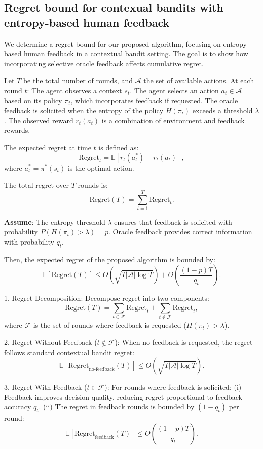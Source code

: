 \subsection{Regret bound for contexual bandits with entropy-based human feedback}

We determine a regret bound for our proposed algorithm, focusing on entropy-based human feedback in a contextual bandit setting. The goal is to show how incorporating selective oracle feedback affects cumulative regret.


Let \(T\) be the total number of rounds, and \(\mathcal{A}\) the set of available actions. At each round \(t\): The agent observes a context \(s_t\). The agent selects an action \(a_t \in \mathcal{A}\) based on its policy \(\pi_t\), which incorporates feedback if requested. The oracle feedback is solicited when the entropy of the policy \(H(\pi_t)\) exceeds a threshold \(\lambda\). The observed reward \(r_t(a_t)\) is a combination of environment and feedback rewards.

The expected regret at time \(t\) is defined as:
\[
\text{Regret}_t = \mathbb{E}[r_t(a^*_t) - r_t(a_t)],
\]
where \(a^*_t = \pi^*(s_t)\) is the optimal action.

The total regret over \(T\) rounds is:
\[
\text{Regret}(T) = \sum_{t=1}^T \text{Regret}_t.
\]


\textbf{Assume}:
The entropy threshold \(\lambda\) ensures that feedback is solicited with probability \(P(H(\pi_t) > \lambda) = p\).
Oracle feedback provides correct information with probability \(q_t\).

Then, the expected regret of the proposed algorithm is bounded by:
\[
\mathbb{E}[\text{Regret}(T)] \leq O\left(\sqrt{T |\mathcal{A}| \log T}\right) + O\left(\frac{(1 - p) T}{q_t}\right).
\]

1. Regret Decomposition:
   Decompose regret into two components:
   \[
   \text{Regret}(T) = \sum_{t \in \mathcal{F}} \text{Regret}_t + \sum_{t \notin \mathcal{F}} \text{Regret}_t,
   \]
   where \(\mathcal{F}\) is the set of rounds where feedback is requested (\(H(\pi_t) > \lambda\)).

2. Regret Without Feedback (\(t \notin \mathcal{F}\)):
   When no feedback is requested, the regret follows standard contextual bandit regret:
   \[
   \mathbb{E}[\text{Regret}_{\text{no-feedback}}(T)] \leq O(\sqrt{T |\mathcal{A}| \log T}).
   \]

3. Regret With Feedback (\(t \in \mathcal{F}\)):
   For rounds where feedback is solicited: (i) Feedback improves decision quality, reducing regret proportional to feedback accuracy \(q_t\). (ii) The regret in feedback rounds is bounded by \((1 - q_t)\) per round:
   \[
   \mathbb{E}[\text{Regret}_{\text{feedback}}(T)] \leq O\left(\frac{(1 - p) T}{q_t}\right).
   \]

